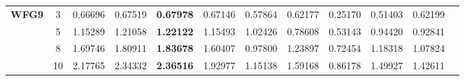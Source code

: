 \documentclass{sig-alternate}
\begin{document}
\begin{table}[!htb]
\begin{tabular}{|c|c|c|c|c|c|c|c|c|c|c|c|}
\multirow{4}{*}{\textbf{WFG9}}  & 3          & 0.66696          & 0.67519           & \textbf{0.67978}      & 0.67146          & 0.57864             & 0.62177             & 0.25170            & 0.51403              & 0.62199          \\ \cline{2-11} 
& 5          & 1.15289          & 1.21058           & \textbf{1.22122}      & 1.15493          & 1.02426             & 0.78608             & 0.53143            & 0.94420              & 0.92841          \\ \cline{2-11} 
& 8          & 1.69746          & 1.80911           & \textbf{1.83678}      & 1.60407          & 0.97800             & 1.23897             & 0.72454            & 1.18318              & 1.07824          \\ \cline{2-11} 
& 10         & 2.17765          & 2.34332           & \textbf{2.36516}      & 1.92977          & 1.15138             & 1.59168             & 0.86178            & 1.49927              & 1.42611          \\ \hline
\end{tabular}
\end{table}
\end{document}
